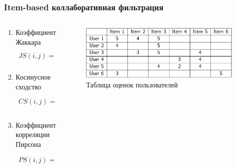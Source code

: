 \documentclass[10pt, unicode]{beamer}
\begin{document}
\begin{frame}
  \frametitle{Item-based коллаборативная фильтрация}
  \begin{columns}[T]
    \begin{column}{.6\textwidth}
     		\begin{enumerate}
          \item Коэффициент Жаккара
          \begin{align*}
            JS(i,j) = \frac{|U_i \cap U_j|}{|U_i \cup U_j|}
          \end{align*}
          \item Косинусное сходство
          \begin{align*}
            CS(i,j) = \frac{\sum_{u \in U_{ij}} r_{ui}r_{uj}}{\sqrt{\sum_{u \in U_{ij}} r_{ui}^2}\sqrt{\sum_{u \in U_{ij}} r_{uj}^2}}
          \end{align*}
          \item Коэффициент корреляции Пирсона
          \begin{align*}
            PS(i,j) = \frac
              {\sum_{u \in U_{ij}} (r_{ui} - \hat{r}_i)(r_{uj} - \hat{r}_j)}
              {\sqrt{\sum_{u \in U_{ij}} (r_{ui} - \hat{r}_i)^2}\sqrt{\sum_{u \in U_{ij}} (r_{uj} - \hat{r}_j)^2}}
          \end{align*}
        \end{enumerate}
    	\end{column}
    	\begin{column}{.4\textwidth}
    		\begin{figure}
    			\includegraphics[width=\textwidth]{images/user_item.png}
    			\caption{Таблица оценок пользователей}
    		\end{figure}
      \end{column}
  \end{columns}
\end{frame}
\end{document}

